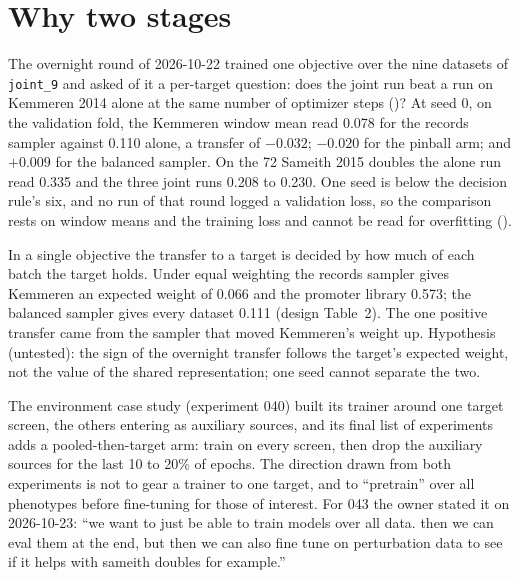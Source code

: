 
\section{Why two stages}
\label{sec:why}

The overnight round of 2026-10-22 trained one objective over the nine datasets of
\texttt{joint\_9} and asked of it a per-target question: does the joint run beat a run on
Kemmeren 2014 alone at the same number of optimizer steps ()? At seed 0, on the
validation fold, the Kemmeren window mean read 0.078 for the records sampler against 0.110
alone, a transfer of $-0.032$; $-0.020$ for the pinball arm; and $+0.009$ for the balanced
sampler. On the 72 Sameith 2015 doubles the alone run read 0.335 and the three joint runs
0.208 to 0.230. One seed is below the decision rule's six, and no run of that round logged a
validation loss, so the comparison rests on window means and the training loss and cannot be
read for overfitting ().

In a single objective the transfer to a target is decided by how much of each batch the
target holds. Under equal weighting the records sampler gives Kemmeren an expected weight of
0.066 and the promoter library 0.573; the balanced sampler gives every dataset 0.111
(design Table~2). The one positive transfer came from the sampler that moved Kemmeren's weight
up. Hypothesis (untested): the sign of the overnight transfer follows the target's expected
weight, not the value of the shared representation; one seed cannot separate the two.

The environment case study (experiment 040) built its trainer around one target screen, the
others entering as auxiliary sources, and its final list of experiments adds a
pooled-then-target arm: train on every screen, then drop the auxiliary sources for the last 10
to 20\% of epochs. The direction drawn from both experiments is not to gear a trainer to one
target, and to ``pretrain'' over all phenotypes before fine-tuning for those of interest. For
043 the owner stated it on 2026-10-23: ``we want to just be able to train models over all
data. then we can eval them at the end, but then we can also fine tune on perturbation data to
see if it helps with sameith doubles for example.''

